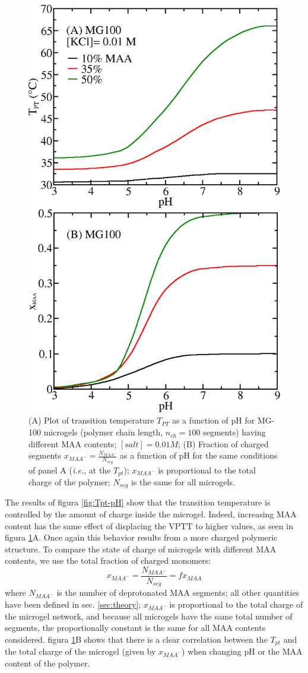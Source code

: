 \begin{figure}[!tb]
	\centering
	\includegraphics[width=0.5\linewidth]{Figures/graph-gel/Tpt-pH_MAA.png}
	\caption{(A) Plot of transition temperature $T_{PT}$ as a function of pH for MG-100 microgels (polymer chain length, $n_{ch}=100$ segments) having different MAA contents; $[salt]=0.01 M$;
		(B) Fraction of charged segments $x_{MAA^-}=\frac{N_{MAA^-}}{N_{seg}}$ as a function of pH for the same conditions of panel A (\emph{i.e.}, at the $T_{pt}$); $x_{MAA^-}$ is proportional to the total charge of the polymer; $N_{seg}$ is the same for all microgels.}
	\label{fig:Tpt_MAA}
\end{figure}



The results of figura \ref{fig:Tpt-pH} show that the transition temperature is controlled by the amount of charge inside the microgel.
Indeed, increasing MAA content has the same effect of displacing the VPTT to higher values, as seen in figura  \ref{fig:Tpt_MAA}A.
Once again this behavior results from a more charged polymeric structure.
To compare the state of charge of microgels with different MAA contents, we use the total fraction of charged monomers:
%
\begin{equation}
x_{MAA^-}=\frac{N_{MAA^-}}{N_{seg}}=f x_{MAA}
\end{equation}
%
\noindent where $N_{MAA^-}$ is the number of deprotonated MAA segments; all other quantities have been defined in sec. \ref{sec:theory};
$x_{MAA^-}$ is proportional to the total charge of the microgel network, and
because all microgels have the same total number of segments, the proportionally constant is the same for all MAA contents considered.
figura \ref{fig:Tpt_MAA}B shows that there is a clear correlation between the $T_{pt}$ and the total charge of the microgel (given by $x_{MAA^-}$) when changing pH or the MAA content of the polymer.

